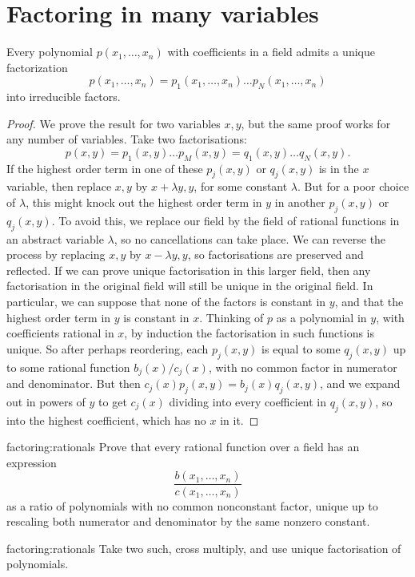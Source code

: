 \section{Factoring in many variables}
\begin{theorem}\label{theorem:ufd}
Every polynomial \(p(x_1,\dots,x_n)\) with coefficients in a field admits a unique factorization
\[
p(x_1,\dots,x_n)=p_1(x_1,\dots,x_n)\dots p_N(x_1,\dots,x_n)
\]
into irreducible factors.
\end{theorem}
\begin{proof}
We prove the result for two variables \(x,y\), but the same proof works for any number of variables.
Take two factorisations:
\[
p(x,y)=p_1(x,y)\dots p_M(x,y)=q_1(x,y)\dots q_N(x,y).
\]
If the highest order term in one of these \(p_j(x,y)\) or \(q_j(x,y)\) is in the \(x\) variable, then replace \(x,y\) by \(x+\lambda y,y\), for some constant \(\lambda\).
But for a poor choice of \(\lambda\), this might knock out the highest order term in \(y\) in another \(p_j(x,y)\) or \(q_j(x,y)\).
To avoid this, we replace our field by the field of rational functions in an abstract variable \(\lambda\), so no cancellations can take place.
We can reverse the process by replacing \(x,y\) by \(x-\lambda y,y\), so factorisations are preserved and reflected.
If we can prove unique factorisation in this larger field, then any factorisation in the original field will still be unique in the original field.
In particular, we can suppose that none of the factors is constant in \(y\), and that the highest order term in \(y\) is constant in \(x\).
Thinking of \(p\) as a polynomial in \(y\), with coefficients rational in \(x\), by induction the factorisation in such functions is unique.
So after perhaps reordering, each \(p_j(x,y)\) is equal to some \(q_j(x,y)\) up to some rational function \(b_j(x)/c_j(x)\), with no common factor in numerator and denominator.
But then \(c_j(x)p_j(x,y)=b_j(x)q_j(x,y)\), and we expand out in powers of \(y\) to get \(c_j(x)\) dividing into every coefficient in \(q_j(x,y)\), so into the highest coefficient, which has no \(x\) in it.
\end{proof}

\begin{problem}{factoring:rationals}
Prove that every rational function over a field has an expression 
\[
\frac{b(x_1,\dots,x_n)}{c(x_1,\dots,x_n)}
\]
as a ratio of polynomials with no common nonconstant factor, unique up to rescaling both numerator and denominator by the same nonzero constant.
\end{problem}
\begin{answer}{factoring:rationals}
Take two such, cross multiply, and use unique factorisation of polynomials.
\end{answer}
